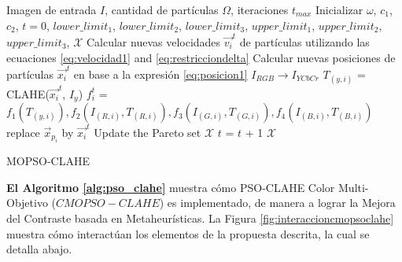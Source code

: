 \begin{algorithm}[H]
\scriptsize
\begin{algorithmic}[1]
\Require Imagen de entrada $I$, cantidad de partículas $\Omega$\label{symbol:mopsocantparticulas}, iteraciones $t_{max}$ 
\State Inicializar $\omega$, $c_1$, $c_2$, $t=0$, $lower\_limit_1$, $lower\_limit_2$, $lower\_limit_3$, $upper\_limit_1$, $upper\_limit_2$, $upper\_limit_3$, $\mathscr{X}$
        \State Calcular nuevas velocidades $\overrightarrow{v_i}^t$ de partículas utilizando las ecuaciones \eqref{eq:velocidad1} and \eqref{eq:restricciondelta}
        \State Calcular nuevas posiciones de partículas $\overrightarrow{x_i}^t$ en base a la expresión \eqref{eq:posicion1}
        \State $I_{RGB} \longrightarrow I_{YCbCr}$
        \State ${T_{(y,i)}}$ = CLAHE(${\overrightarrow{x_i}^t}$, ${I_y}$)
                \State ${f^t_i}$ = $f_1({T_{(y,i)}}),f_2({I_{(R,i)},T_{(R,i)}}),f_3({I_{(G,i)},T_{(G,i)}}),f_4({I_{(B,i)},T_{(B,i)}})$%
                \State replace $\overrightarrow{x}_{p_i}$ by $\overrightarrow{x_i}^t$
                \EndIf
                \State Update the Pareto set $\mathscr{X}$
                \EndIf
                \State $t$ = $t$ + 1
                \EndFor
                \EndWhile
                \Ensure $\mathscr{X}$
                \end{algorithmic}
                \caption{MOPSO-CLAHE}
                \label{alg:pso_clahe}
                \end{algorithm}

                \textbf {El Algoritmo \ref{alg:pso_clahe}} muestra cómo PSO-CLAHE Color Multi-Objetivo ($CMOPSO-CLAHE$) es implementado, de manera a lograr la Mejora del Contraste basada en Metaheurísticas. La Figura \ref{fig:interaccioncmopsoclahe} muestra cómo interactúan los elementos de la propuesta descrita, la cual se detalla abajo.

